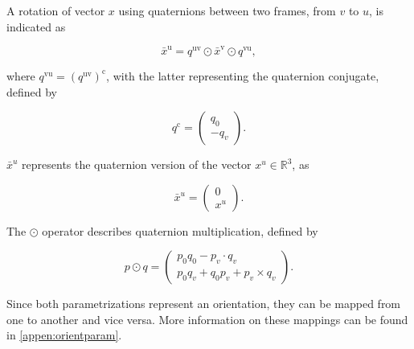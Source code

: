 A rotation of vector $x$ using quaternions between two frames, from $v$ to $u$, is indicated as

\begin{equation}
	\label{eq:quat_rot}
	\bar{x}^{\mathrm{u}}=q^{\mathrm{uv}} \odot \bar{x}^{\mathrm{v}} \odot q^{\mathrm{vu}},
\end{equation}

where $q^{\mathrm{vu}} = \left(q^{\mathrm{uv}}\right)^{\mathrm{c}}$, with the latter representing the quaternion conjugate, defined by 

\begin{equation}
	\label{eq:quat_conjugate}
	q^{\mathrm{c}}=\left(\begin{array}{c}{q_{0}} \\ {-q_{v}}\end{array}\right).
\end{equation}

$\bar{x}^u$ represents the quaternion version of the vector $x^u \in \mathbb{R}^3$, as

\begin{equation}
	\label{eq:quat_vec_ref}
	\bar{x}^u=\left(\begin{array}{l}{0} \\ {x^u}\end{array}\right).
\end{equation}


The $\odot$ operator describes quaternion multiplication, defined by

\begin{equation}
	\label{eq:quat_multiplication}
	p \odot q=\left(\begin{array}{c}{p_{0} q_{0}-p_{v} \cdot q_{v}} \\ {p_{0} q_{v}+q_{0} p_{v}+p_{v} \times q_{v}}\end{array}\right).
\end{equation}

Since both parametrizations represent an orientation, they can be mapped from one to another and vice versa. More information on these mappings can be found in \cref{appen:orientparam}.

